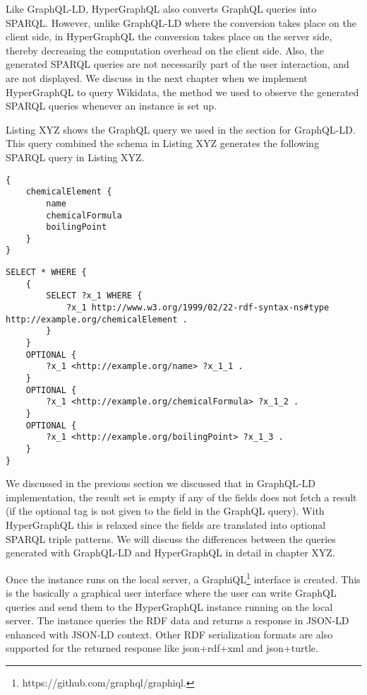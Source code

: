 Like GraphQL-LD, HyperGraphQL also converts GraphQL queries into SPARQL. However, unlike GraphQL-LD where the conversion takes place on the client side, in HyperGraphQL the conversion takes place on the server side, thereby decreasing the computation overhead on the client side. Also, the generated SPARQL queries are not necessarily part of the user interaction, and are not displayed. We discuss in the next chapter when we implement HyperGraphQL to query Wikidata, the method we used to observe the generated SPARQL queries whenever an instance is set up.

Listing XYZ shows the GraphQL query we used in the section for GraphQL-LD. This query combined the schema in Listing XYZ generates the following SPARQL query in Listing XYZ.


\begin{minipage}{\linewidth}
\begin{lstlisting}[label=listing:listing15, caption={An example query}]
{
	chemicalElement {
		name
		chemicalFormula
		boilingPoint
	}
}
\end{lstlisting}
\end{minipage}


\begin{minipage}{\linewidth}
\begin{lstlisting}[label=listing:listing16, caption={The generated SPARQL query}]
SELECT * WHERE { 
	{ 
   		SELECT ?x_1 WHERE { 
    		?x_1 http://www.w3.org/1999/02/22-rdf-syntax-ns#type http://example.org/chemicalElement . 
		}  
 	}  
 	OPTIONAL { 
 		?x_1 <http://example.org/name> ?x_1_1 . 
 	}  
	OPTIONAL { 
		?x_1 <http://example.org/chemicalFormula> ?x_1_2 . 
	}  
	OPTIONAL { 
		?x_1 <http://example.org/boilingPoint> ?x_1_3 . 
	}  
}
\end{lstlisting}
\end{minipage}

We discussed in the previous section we discussed that in GraphQL-LD implementation, the result set is empty if any of the fields does not fetch a result (if the optional tag is not given to the field in the GraphQL query). With HyperGraphQL this is relaxed since the fields are translated into optional SPARQL triple patterns. We will discuss the differences between the queries generated with GraphQL-LD and HyperGraphQL in detail in chapter XYZ.

Once the instance runs on the local server, a GraphiQL\footnote{https://github.com/graphql/graphiql.} interface is created. This is the basically a graphical user interface where the user can write GraphQL queries and send them to the HyperGraphQL instance running on the local server. The instance queries the RDF data and returns a response in JSON-LD enhanced with JSON-LD context. Other RDF serialization formats are also supported for the returned response like json+rdf+xml and json+turtle.
